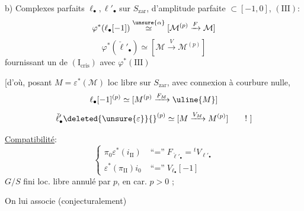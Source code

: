 b) Complexes parfaits $\ell_{\bullet},\ell'_{\bullet}$ sur $S_{\mathrm{zar}}$, d'amplitude parfaite $\subset[-1,0]$,   $(\mathrm {III})$:
\[
\varphi^*(\ell_{\bullet}[-1])\overset{\unsure{\alpha}}\simeq[\mathcal M^{(p)}\xrightarrow{F}\mathcal M]
\]
\[
\varphi^*(\check\ell'_{\bullet})\simeq[\mathcal M\xrightarrow{V}\mathcal M^{(p)}]
\]
fournissant un   de $(\mathrm I_{\mathrm{cris}})$ avec $\varphi^*(\mathrm {III})$

\deleted{\unsure{[}} [d'où, posant $M=\varepsilon^*(\mathcal M)$ loc libre sur $S_{\mathrm{zar}}$, avec connexion à courbure nulle,
\[
\ell_{\bullet}[-1]^{(p)}\simeq[M^{(p)}\xrightarrow{F_M}\uline{M}]
\]
\[
\check\ell'_{\bullet}\deleted{\unsure{\varepsilon}}{}^{(p)}\simeq[M\xrightarrow{V_M}M^{(p)}]\qquad !\ ]
\]

\uline{Compatibilité}: 
\[
\left\{\begin{aligned}
\pi_0\varepsilon^*(i_{\mathrm {II}})&\mathrel{\text{``$=$''}}F_{\check\ell'_{\bullet}}={}^tV_{\ell'_{\bullet}}\\
\varepsilon^*(\pi_{\mathrm {II}})i_0&\mathrel{\text{``$=$''}}V_{\ell_{\bullet}}[-1]
\end{aligned}\right.
\]
$G/S$  fini loc. libre annulé par $p$, en car. $p>0$ ;

On lui associe (conjecturalement)

